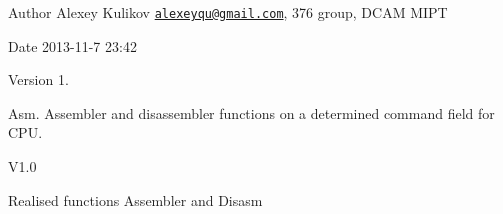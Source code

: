 \begin{DoxyAuthor}{Author}
Alexey Kulikov \href{mailto:alexeyqu@gmail.com}{\tt alexeyqu@gmail.\-com}, 376 group, D\-C\-A\-M M\-I\-P\-T 
\end{DoxyAuthor}
\begin{DoxyDate}{Date}
2013-\/11-\/7 23\-:42 
\end{DoxyDate}
\begin{DoxyVersion}{Version}
1.
\end{DoxyVersion}
Asm. Assembler and disassembler functions on a determined command field for C\-P\-U.

\begin{DoxyParagraph}{V1.0}

\begin{DoxyItemize}
\item Realised functions Assembler and Disasm 
\end{DoxyItemize}
\end{DoxyParagraph}
